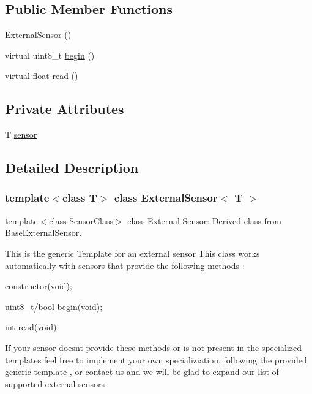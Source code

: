 \subsection*{Public Member Functions}
\begin{DoxyCompactItemize}
\item 
\hyperlink{class_external_sensor_a8b991447fba33253103d06198b838751}{External\+Sensor} ()
\item 
virtual uint8\+\_\+t \hyperlink{class_external_sensor_ab6fe1379d55b656a048e0fba1e0a32e6}{begin} ()
\item 
virtual float \hyperlink{class_external_sensor_a5fb3afc7d244fb86dac68ab5481bc407}{read} ()
\end{DoxyCompactItemize}
\subsection*{Private Attributes}
\begin{DoxyCompactItemize}
\item 
T \hyperlink{class_external_sensor_a6e1f518119abe08c14b498ce24a7e1b3}{sensor}
\end{DoxyCompactItemize}


\subsection{Detailed Description}
\subsubsection*{template$<$class T$>$\newline
class External\+Sensor$<$ T $>$}

template$<$class Sensor\+Class$>$ class External Sensor\+: Derived class from \hyperlink{class_base_external_sensor}{Base\+External\+Sensor}. 

This is the generic Template for an external sensor This class works automatically with sensors that provide the following methods \+:
\begin{DoxyItemize}
\item constructor(void);
\item uint8\+\_\+t/bool \hyperlink{class_external_sensor_ab6fe1379d55b656a048e0fba1e0a32e6}{begin(void)};
\item int \hyperlink{class_external_sensor_a5fb3afc7d244fb86dac68ab5481bc407}{read(void)};
\end{DoxyItemize}

If your sensor doesn\textquotesingle{}t provide these methods or is not present in the specialized templates feel free to implement your own specializiation, following the provided generic template , or contact us and we will be glad to expand our list of supported external sensors 

